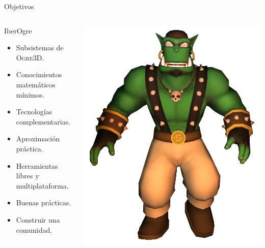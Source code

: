 \documentclass[green]{beamer}
\begin{document}

\begin{frame}{Objetivos}
    \begin{columns}[t]
    
    \column{200px}
	\begin{block}{IberOgre}
	    \begin{itemize}
		\item Subsistemas de \textsc{Ogre3D}.
		\item Conocimientos matemáticos mínimos.
		\item Tecnologías complementarias.
		\item Aproximación práctica.
		\item Herramientas libres y multiplataforma.
		\item Buenas prácticas.
		\item Construir una comunidad.
	    \end{itemize}
	\end{block}
	
    \column{100px}
    
    \begin{center}
	\includegraphics[scale=0.22]{img/sinbad.png}
    \end{center}
    
    \end{columns}
\end{frame}
\end{document}
